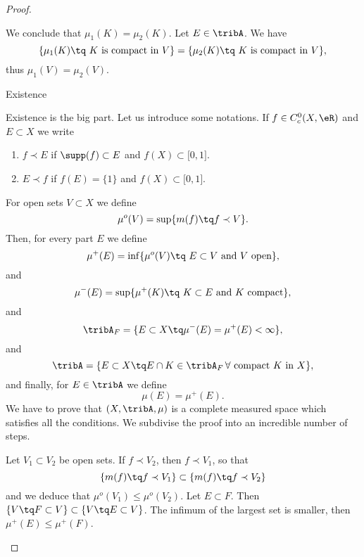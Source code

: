 \begin{proof}
\begin{subproof}
    We conclude that \( \mu_1(K)=\mu_2(K)\).
\spitem[Unicity]
    Let \( E\in\tribA\). We have
    \begin{equation}
        \{ \mu_1(K)\tq \text{ \( K\) is compact in \( V\)} \} = \{ \mu_2(K)\tq \text{ \( K\) is compact in \( V\)} \},
    \end{equation}
    thus \( \mu_1(V)=\mu_2(V)\).
    \end{subproof}
    \begin{center}
        Existence
    \end{center}
    Existence is the big part. Let us introduce some notations. If \( f\in C^0_c(X,\eR)\) and \( E\subset X\) we write
    \begin{enumerate}
        \item \( f\prec E\) if \( \supp(f)\subset E\) and \( f(X)\subset \mathopen[ 0 , 1 \mathclose]\).
        \item \( E\prec f\) if \( f(E)=\{ 1 \}\) and \( f(X)\subset \mathopen[ 0 , 1 \mathclose]\).
    \end{enumerate}
    For open sets \( V\subset X\) we define
    \begin{equation}
        \mu^o(V)=\sup\{ m(f)\tq f\prec V \}.
    \end{equation}
    Then, for every part \( E\) we define
    \begin{equation}
        \mu^+(E)=\inf\{ \mu^o(V)\tq \text{ \( E\subset V\) and \( V\) open} \},
    \end{equation}
    and
    \begin{equation}        \label{EQooSIKUooJeeIqI}
        \mu^-(E)=\sup\{ \mu^+(K)\tq \text{ \( K\subset E\) and \( K\) compact} \},
    \end{equation}
    and
    \begin{equation}
        \tribA_F=\{ E\subset X\tq \mu^-(E)=\mu^+(E)<\infty \},
    \end{equation}
    and
    \begin{equation}
        \tribA=\{ E\subset X\tq E\cap K\in \tribA_F\,\text{\( \forall\) compact \( K\) in \( X\)} \},
    \end{equation}
    and finally, for \( E\in \tribA\) we define
    \begin{equation}
        \mu(E)=\mu^+(E).
    \end{equation}
    We have to prove that \( (X,\tribA,\mu)\) is a complete measured space which satisfies all the conditions. We subdivise the proof into an incredible number of steps.
    \begin{subproof}
    \spitem[\( \mu^o\) is increasing]     \label{ITEMooOMDSooQiYmaP}
        Let \( V_1\subset V_2\) be open sets. If \( f\prec V_2\), then \( f\prec V_1\), so that
        \begin{equation}
            \{ m(f)\tq f\prec V_1 \}\subset \{ m(f)\tq f\prec V_2 \}
        \end{equation}
        and we deduce that \( \mu^o(V_1)\leq \mu^o(V_2)\).
        \spitem[\( \mu^+\) is increasing]       \label{ITEMooGODTooQNQzfz}
        Let \( E\subset F\). Then \( \{ V\tq F\subset V \}\subset \{ V\tq E\subset V \}\). The infimum of the largest set is smaller, then \( \mu^+(E)\leq\mu^+(F)\).


\end{subproof}
\end{proof}
